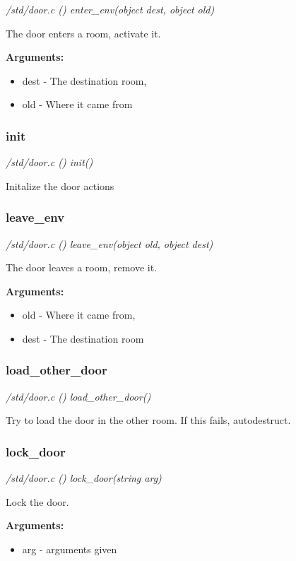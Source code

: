 {\em /std/door.c () enter\_env(object dest, object old)}

The door enters a room, activate it.

{\bf Arguments:}
\begin{itemize}
\item     dest - The destination room,
\item old - Where it came from
\end{itemize}


\subsubsection{init}

{\em /std/door.c () init()}

Initalize the door actions


\subsubsection{leave\_env}

{\em /std/door.c () leave\_env(object old, object dest)}

The door leaves a room, remove it.

{\bf Arguments:}
\begin{itemize}
\item      old - Where it came from,
\item dest - The destination room
\end{itemize}


\subsubsection{load\_other\_door}

{\em /std/door.c () load\_other\_door()}

Try to load the door in the other room. If this
fails, autodestruct.


\subsubsection{lock\_door}

{\em /std/door.c () lock\_door(string arg)}

Lock the door.

{\bf Arguments:}
\begin{itemize}
\item     arg - arguments given
\end{itemize}


